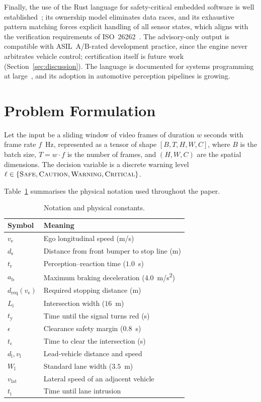\documentclass[conference, a4paper]{IEEEtran}
\theoremstyle{plain}
\newcommand{\dreq}{d_{\mathrm{req}}}
\newcommand{\ds}{d_{\mathrm{s}}}
\newcommand{\dl}{d_{\mathrm{l}}}
\newcommand{\tclear}{t_{\mathrm{c}}}
\newcommand{\tred}{t_{\mathrm{y}}}
\newcommand{\tint}{t_{\mathrm{i}}}
\newcommand{\ab}{a_{\mathrm{b}}}
\newcommand{\tr}{t_{\mathrm{r}}}
\newcommand{\Li}{L_{\mathrm{i}}}
\newcommand{\Wl}{W_{\mathrm{l}}}
\newcommand{\ve}{v_{\mathrm{e}}}
\newcommand{\vl}{v_{\mathrm{l}}}
\newcommand{\vlat}{v_{\mathrm{lat}}}
\begin{document}
Finally, the use of the Rust language for safety-critical embedded software
is well established~\cite{matsakis2014rust}; its ownership model eliminates
data races, and its exhaustive pattern matching forces explicit handling of
all sensor states, which aligns with the verification requirements of
ISO~26262~\cite{iso26262}. The advisory-only output is compatible with
ASIL~A/B-rated development practice, since the engine never arbitrates
vehicle control; certification itself is future work
(Section~\ref{sec:discussion}). The language is documented for systems
programming at large~\cite{klabnik2019}, and its adoption in automotive
perception pipelines is growing.

\section{Problem Formulation}
\label{sec:formulation}

Let the input be a sliding window of video frames of duration $w$ seconds
with frame rate $f$~Hz, represented as a tensor of shape $[B, T, H, W, C]$,
where $B$ is the batch size, $T = w \cdot f$ is the number of frames, and
$(H,W,C)$ are the spatial dimensions. The decision variable is a discrete
warning level $\ell \in \{\textsc{Safe}, \textsc{Caution},
\textsc{Warning}, \textsc{Critical}\}$.

Table~\ref{tab:notation} summarises the physical notation used throughout
the paper.

\begin{table}[t]
\caption{Notation and physical constants.}
\label{tab:notation}
\centering
\small
\begin{tabular}{@{}ll@{}}
\toprule
Symbol & Meaning \\
\midrule
$\ve$        & Ego longitudinal speed (\si{m/s}) \\
$\ds$        & Distance from front bumper to stop line (\si{m}) \\
$\tr$        & Perception--reaction time ($1.0$~\si{s}) \\
$\ab$        & Maximum braking deceleration ($4.0$~\si{m/s^2}) \\
$\dreq(\ve)$ & Required stopping distance (\si{m}) \\
$\Li$        & Intersection width ($16$~\si{m}) \\
$\tred$      & Time until the signal turns red (\si{s}) \\
$\epsilon$   & Clearance safety margin ($0.8$~\si{s}) \\
$\tclear$    & Time to clear the intersection (\si{s}) \\
$\dl,\vl$    & Lead-vehicle distance and speed \\
$\Wl$        & Standard lane width ($3.5$~\si{m}) \\
$\vlat$      & Lateral speed of an adjacent vehicle \\
$\tint$      & Time until lane intrusion \\
\bottomrule
\end{tabular}
\end{table}
\end{document}
